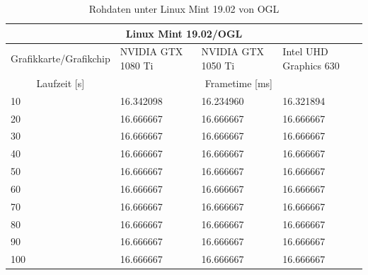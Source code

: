 \documentclass[titlepage, 11pt, a4paper, ngerman]{article}
\begin{document}
\begin{table}[ht]
    \centering
    \caption[Rohdaten unter \gls{Linux} Mint 19.02 von OGL]{Rohdaten unter \gls{Linux} Mint 19.02 von OGL}
    \bigbreak
    \begin{tabular}{|p{4cm}||p{2.5cm}|p{2.5cm}|p{3cm}|}
    \hline
    \multicolumn{4}{|c|}{\gls{Linux} Mint 19.02/OGL} \\
    \hline
    Grafikkarte/Grafikchip & NVIDIA GTX 1080 Ti & NVIDIA GTX 1050 Ti & Intel UHD Graphics 630 \\
    \hline
    \hline
    \multicolumn{1}{|c||}{Laufzeit [s]} & \multicolumn{3}{|c|}{\gls{Frametime} [ms]} \\
    \hline
    10 & 16.342098 & 16.234960 & 16.321894 \\
    \hline
    20 & 16.666667 & 16.666667 & 16.666667 \\
    \hline
    30 & 16.666667 & 16.666667 & 16.666667 \\
    \hline
    40 & 16.666667 & 16.666667 & 16.666667 \\
    \hline
    50 & 16.666667 & 16.666667 & 16.666667 \\
    \hline
    60 & 16.666667 & 16.666667 & 16.666667 \\
    \hline
    70 & 16.666667 & 16.666667 & 16.666667 \\
    \hline
    80 & 16.666667 & 16.666667 & 16.666667 \\
    \hline
    90 & 16.666667 & 16.666667 & 16.666667 \\
    \hline
    100 & 16.666667 & 16.666667 & 16.666667 \\
    \hline
    \end{tabular}
    \label{Tab:results-raw-mint-ogl}
\end{table}
\pagebreak
\end{document}
